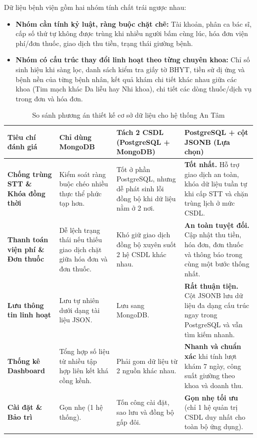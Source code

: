 \documentclass[12pt,a4paper]{report}
\begin{document}
Dữ liệu bệnh viện gồm hai nhóm tính chất trái ngược nhau:
\begin{itemize}
  \item \textbf{Nhóm cần tính kỷ luật, ràng buộc chặt chẽ:} Tài khoản, phân ca bác sĩ, cấp số thứ tự không được trùng khi nhiều người bấm cùng lúc, hóa đơn viện phí/đơn thuốc, giao dịch thu tiền, trạng thái giường bệnh.
  \item \textbf{Nhóm có cấu trúc thay đổi linh hoạt theo từng chuyên khoa:} Chỉ số sinh hiệu khi sàng lọc, danh sách kiểm tra giấy tờ BHYT, tiền sử dị ứng và bệnh nền của từng bệnh nhân, kết quả khám chi tiết khác nhau giữa các khoa (Tim mạch khác Da liễu hay Nhi khoa), chi tiết các dòng thuốc/dịch vụ trong đơn và hóa đơn.
\end{itemize}

\begin{table}[H]
  \centering
  \caption{So sánh phương án thiết kế cơ sở dữ liệu cho hệ thống An Tâm}
  \label{tab:db-compare}
  \begin{tabularx}{\textwidth}{@{}l X X X@{}}
    \toprule
    \textbf{Tiêu chí đánh giá} & \textbf{Chỉ dùng MongoDB} & \textbf{Tách 2 CSDL (PostgreSQL + MongoDB)} & \textbf{PostgreSQL + cột JSONB (Lựa chọn)} \\
    \midrule
    \textbf{Chống trùng STT \& Khóa đồng thời} & Kiểm soát ràng buộc chéo nhiều thực thể phức tạp hơn. & Tốt ở phần PostgreSQL, nhưng dễ phát sinh lỗi đồng bộ khi dữ liệu nằm ở 2 nơi. & \textbf{Tốt nhất.} Hỗ trợ giao dịch an toàn, khóa dữ liệu tuần tự khi cấp STT và chặn trùng lịch ở mức CSDL. \\
    \addlinespace
    \textbf{Thanh toán viện phí \& Đơn thuốc} & Dễ lệch trạng thái nếu thiếu giao dịch chặt giữa hóa đơn và đơn thuốc. & Khó giữ giao dịch đồng bộ xuyên suốt 2 hệ CSDL khác nhau. & \textbf{An toàn tuyệt đối.} Cập nhật thu tiền, hóa đơn, đơn thuốc và thông báo trong cùng một bước thống nhất. \\
    \addlinespace
    \textbf{Lưu thông tin linh hoạt} & Lưu tự nhiên dưới dạng tài liệu JSON. & Lưu sang MongoDB. & \textbf{Rất thuận tiện.} Cột JSONB lưu dữ liệu đa dạng cấu trúc ngay trong PostgreSQL và vẫn tìm kiếm nhanh. \\
    \addlinespace
    \textbf{Thống kê Dashboard} & Tổng hợp số liệu từ nhiều tập hợp liên kết khá cồng kềnh. & Phải gom dữ liệu từ 2 nguồn khác nhau. & \textbf{Nhanh và chuẩn xác} khi tính lượt khám 7 ngày, công suất giường theo khoa và doanh thu. \\
    \addlinespace
    \textbf{Cài đặt \& Bảo trì} & Gọn nhẹ (1 hệ thống). & Tốn công cài đặt, sao lưu và đồng bộ gấp đôi. & \textbf{Gọn nhẹ tối ưu} (chỉ 1 hệ quản trị CSDL duy nhất cho toàn bộ ứng dụng). \\
    \bottomrule
  \end{tabularx}
\end{table}
\end{document}
